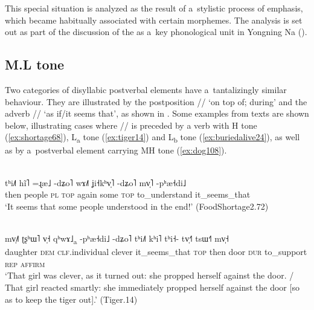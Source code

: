 This special situation is analyzed as the result of a~stylistic process of emphasis, which became habitually associated with certain morphemes. The analysis is set out as part of the discussion of the  as a~key phonological unit in Yongning Na ().


\subsection{M.L tone}
\label{sec:mltone}

Two categories of disyllabic postverbal elements have a~tantalizingly similar behaviour. They are illustrated
by the postposition // ‘on top of; during’ and the adverb // ‘as if/it seems that’, as shown in
. Some examples from texts are shown below, illustrating cases where // is preceded by a verb with H tone (\ref{ex:shortage68}), L\textsubscript{a} tone (\ref{ex:tiger14}) and L\textsubscript{b} tone (\ref{ex:buriedalive24}), as well as by a~postverbal element carrying MH tone (\ref{ex:dog108}).

 \begin{exe}
 	\ex
 	\label{ex:shortage68}
 	\\
 	\gll tʰi˩˥		hĩ˥	=ɻæ˩		-dʑo˥			wɤ˩˥		ʝi˧kʰv̩˥	-dʑo˥				mv̩˥					-pʰæ˧di˩\\
 	then	people		\textsc{pl}	\textsc{top}	again	some		\textsc{top}	to\_understand		it\_seems\_that\\
 	\glt ‘It seems that some people understood in the end!' (FoodShortage2.72)
 \end{exe}
 
\begin{exe}
  	\ex
  	\label{ex:tiger14}
  	\\
  	\gll mv̩˩˥		ʈʂʰɯ˥				v̩˧								qʰwɤ˩\textsubscript{a}	-pʰæ˧di˩		-dʑo˥				tʰi˩˥	kʰi˥		tʰi˧-					tv̩˧˥		tsɯ˧˥			mv̩˧\\
  	daughter	\textsc{dem}		\textsc{clf}.individual		clever	it\_seems\_that		\textsc{top}	then	door	\textsc{dur}		to\_support	\textsc{rep}	\textsc{affirm}\\
  	\glt ‘That girl was clever, as it turned out: she propped herself against the door. / That girl reacted smartly: she immediately propped herself against the door [so as to keep the tiger out].' (Tiger.14)
\end{exe}
  
